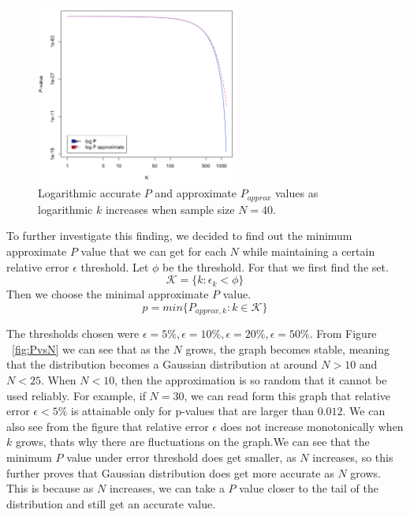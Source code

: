 \documentclass[12pt]{article}
\begin{document}
{\begin{figure}[H]
  \centering
  \includegraphics[width=0.6\textwidth]{logPlogPapproxAsKincreases}
  \caption{Logarithmic accurate $P$ and approximate $P_{approx}$ values as logarithmic $k$ increases when sample size $N=40$.}
  \label{fig:logPlogPapproxAsKincreases}
\end{figure}

To further investigate this finding, we decided to find out the minimum approximate $P$ value that we can get for each $N$ while maintaining a certain relative error $\epsilon$ threshold. Let $\phi$ be the threshold. For that we first find the set.
\begin{equation}
\mathcal{K}=\{k: \epsilon_k < \phi\}
\end{equation}
Then we choose the minimal approximate $P$ value.
\begin{equation}
p = min\{P_{approx, k}: k \in \mathcal{K}\}
\end{equation}

The thresholds chosen were $\epsilon=5\%, \epsilon=10\%, \epsilon=20\%, \epsilon=50\%$. From Figure ~\ref{fig:PvsN} we can see that as the $N$ grows, the graph becomes stable, meaning that the distribution becomes a Gaussian distribution at around $N > 10$ and $N < 25$.  When $N < 10$, then the approximation is so random that it cannot be used reliably. For example, if $N=30$, we can read form this graph that relative error $\epsilon<5\%$ is attainable only for p-values that are larger than $0.012$. We can also see from the figure that relative error $\epsilon$ does not increase monotonically when $k$ grows, thats why there are fluctuations on the graph.We can see that the minimum $P$ value under error threshold does get smaller, as $N$ increases, so this further proves that Gaussian distribution does get more accurate as $N$ grows. This is because as $N$ increases, we can take a $P$ value closer to the tail of the distribution and still get an accurate value.

}
\end{document}

